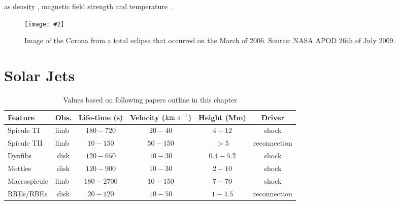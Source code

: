 \documentclass[12pt]{ociamthesis}
\newcommand{\mfig}[4]{
  \begin{figure}
  \begin{center}
  \texttt{[image: \#2]}
  \caption{#3}
  \label{#4}
  \end{center}
  \end{figure}}
\begin{document}
as density \citep{Verwichte_2013A_A}, magnetic field strength \citep{Nakariakov_2001} and temperature \citep{De_Moortel_2003SoPh}.    
\mfig{0.65}{figures/corona_vangorp.png}{Image of the Corona from a total eclipse that occurred on the March of 2006. Source: NASA APOD 26th of July 2009.}{corona_image}
\section{Solar Jets}
\begin{table}[]
\begin{tabular}{|l|l|l|l|l|p{1.7cm}|}
\hline
\textbf{Feature} & \multicolumn{1}{c|}{\textbf{Obs.}} & \multicolumn{1}{c|}{\textbf{Life-time (s)}} & \multicolumn{1}{c|}{\textbf{Velocity ($\rm{km \ s^{-1}}$)}} & \multicolumn{1}{c|}{\textbf{Height (Mm)}} & \multicolumn{1}{c|}{\textbf{Driver}} \\ \hline

Spicule TI  & limb &   \multicolumn{1}{c|}{$180-720$} & \multicolumn{1}{c|}{$20-40$} &  \multicolumn{1}{c|}{$4-12$}  & \multicolumn{1}{c|}{shock} \\ \hline

Spicule TII & limb & \multicolumn{1}{c|}{$ 10-150$} & \multicolumn{1}{c|}{$ 50-150$} & \multicolumn{1}{c|}{$>5$}  & \multicolumn{1}{c|}{reconnection}  \\ \hline

Dynfibs & \multicolumn{1}{c|}{disk} & \multicolumn{1}{c|}{$120-650$} & \multicolumn{1}{c|}{$10-30$} & \multicolumn{1}{c|}{$0.4-5.2$} & \multicolumn{1}{c|}{shock} \\ \hline

Mottles & \multicolumn{1}{c|}{disk} & \multicolumn{1}{c|}{$120-900$} & \multicolumn{1}{c|}{$10-30$} & \multicolumn{1}{c|}{$2-10$} & \multicolumn{1}{c|}{shock} \\ \hline

Macrospicule & limb  & \multicolumn{1}{c|}{$180-2700$} & \multicolumn{1}{c|}{$10-150$}  & \multicolumn{1}{c|}{$7-70$} & \multicolumn{1}{c|}{shock} \\ \hline

RREs/RBEs & \multicolumn{1}{c|}{disk}  & \multicolumn{1}{c|}{$20-120$} & \multicolumn{1}{c|}{$10-50$}  & \multicolumn{1}{c|}{$1-4.5$} & \multicolumn{1}{c|}{reconnection} \\ \hline
\end{tabular}
\caption{Values based on following papers outline in this chapter}
\label{solar_jet_table}
\end{table}
\end{document}
